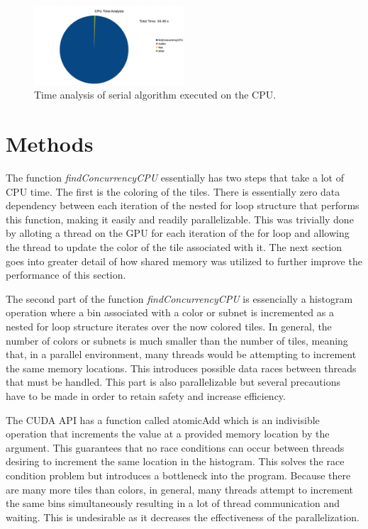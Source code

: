 \documentclass[journal]{IEEEtran}
\begin{document}
\begin{figure}[ht]
\centering
\includegraphics[width=0.5\textwidth]{cpu_time_analysis}
\caption{Time analysis of serial algorithm executed on the CPU.}
\label{fig:cpu_time}
\end{figure}

\section{Methods}

The function \emph{findConcurrencyCPU} essentially has two steps that take a lot of CPU time. The first is the coloring of the tiles. There is essentially zero data dependency between each iteration of the nested for loop structure that performs this function, making it easily and readily parallelizable. This was trivially done by alloting a thread on the GPU for each iteration of the for loop and allowing the thread to update the color of the tile associated with it. The next section goes into greater detail of how shared memory was utilized to further improve the performance of this section.

The second part of the function \emph{findConcurrencyCPU} is essencially a histogram operation where a bin associated with a color or subnet is incremented as a nested for loop structure iterates over the now colored tiles. In general, the number of colors or subnets is much smaller than the number of tiles, meaning that, in a parallel environment, many threads would be attempting to increment the same memory locations. This introduces possible data races between threads that must be handled. This part is also parallelizable but several precautions have to be made in order to retain safety and increase efficiency.

The CUDA API has a function called atomicAdd which is an indivisible operation that increments the value at a provided memory location by the argument. This guarantees that no race conditions can occur between threads desiring to increment the same location in the histogram. This solves the race condition problem but introduces a bottleneck into the program. Because there are many more tiles than colors, in general, many threads attempt to increment the same bins simultaneously resulting in a lot of thread communication and waiting. This is undesirable as it decreases the effectiveness of the parallelization.
\end{document}
